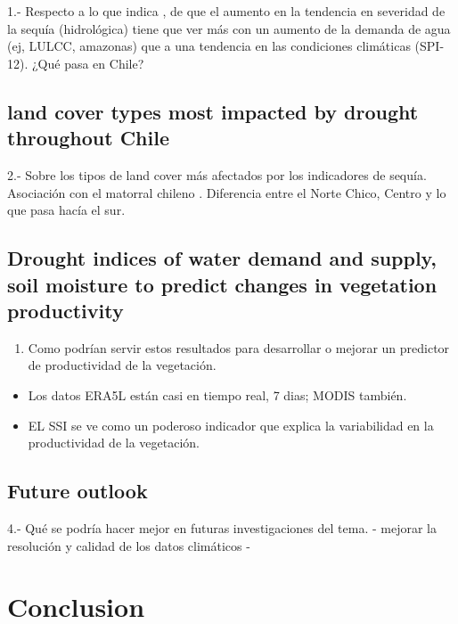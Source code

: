 \documentclass[
  authoryear,
  preprint,
  3p,
  onecolumn]{elsarticle}
\providecommand{\tightlist}{%
  \setlength{\itemsep}{0pt}\setlength{\parskip}{0pt}}\usepackage{longtable,booktabs,array}
\begin{document}
1.- Respecto a lo que indica \citet{Vicente-Serrano2018}, de que el
aumento en la tendencia en severidad de la sequía (hidrológica) tiene
que ver más con un aumento de la demanda de agua (ej, LULCC, amazonas)
que a una tendencia en las condiciones climáticas (SPI-12). ¿Qué pasa en
Chile?

\hypertarget{land-cover-types-most-impacted-by-drought-throughout-chile}{%
\subsection{land cover types most impacted by drought throughout
Chile}\label{land-cover-types-most-impacted-by-drought-throughout-chile}}

2.- Sobre los tipos de land cover más afectados por los indicadores de
sequía. Asociación con el matorral chileno \citep{Fuentes2021}.
Diferencia entre el Norte Chico, Centro y lo que pasa hacía el sur.

\hypertarget{drought-indices-of-water-demand-and-supply-soil-moisture-to-predict-changes-in-vegetation-productivity}{%
\subsection{Drought indices of water demand and supply, soil moisture to
predict changes in vegetation
productivity}\label{drought-indices-of-water-demand-and-supply-soil-moisture-to-predict-changes-in-vegetation-productivity}}

\begin{enumerate}
\def\labelenumi{\arabic{enumi}.}
\setcounter{enumi}{2}
\tightlist
\item
  Como podrían servir estos resultados para desarrollar o mejorar un
  predictor de productividad de la vegetación.
\end{enumerate}

\begin{itemize}
\tightlist
\item
  Los datos ERA5L están casi en tiempo real, 7 dias; MODIS también.
\item
  EL SSI se ve como un poderoso indicador que explica la variabilidad en
  la productividad de la vegetación.
\end{itemize}

\hypertarget{future-outlook}{%
\subsection{Future outlook}\label{future-outlook}}

4.- Qué se podría hacer mejor en futuras investigaciones del tema. -
mejorar la resolución y calidad de los datos climáticos -

\hypertarget{conclusion}{%
\section{Conclusion}\label{conclusion}}

\newpage


\renewcommand\refname{References}
  
\end{document}
